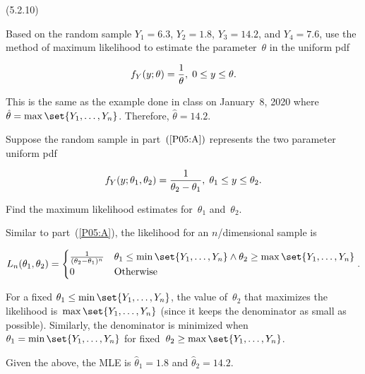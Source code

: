 \begin{problem}
  (\textnormal{5.2.10})
\end{problem}

\begin{subproblem}\label{P05:A}
  Based on the random sample ${Y_1=6.3}$, ${Y_2 = 1.8}$, ${Y_3 = 14.2}$, and ${Y_4 = 7.6}$, use the method of maximum likelihood to estimate the parameter~$\theta$ in the uniform pdf

  \begin{equation}
    f_{Y}(y;\theta) = \frac{1}{\theta}, \hspace{0.1cm} 0 \leq y \leq \theta \text{.}
  \end{equation}
\end{subproblem}

This is the same as the example done in class on January~8, 2020 where ${\hat{\theta} = \max\set{Y_1,\ldots,Y_{n}}}$.  Therefore, $\boxed{{\hat{\theta} = 14.2}}$.

\begin{subproblem}
  Suppose the random sample in part~$(\ref{P05:A})$ represents the two parameter uniform pdf

  \begin{equation}\label{eq:P05:b}
    f_{Y}(y;\theta_1,\theta_2) = \frac{1}{\theta_2 - \theta_1}, \hspace{0.1cm} \theta_{1} \leq y \leq \theta_{2} \text{.}
  \end{equation}

  \noindent
  Find the maximum likelihood estimates for~$\theta_1$ and~$\theta_{2}$.
\end{subproblem}

Similar to part~(\ref{P05:A}), the likelihood for an $n$\-/dimensional sample is

\begin{equation}
  L_{n}(\theta_{1},\theta_{2}) =  \begin{cases}
                                    \frac{1}{(\theta_{2} - \theta_{1})^{n}} & \theta_{1} \leq \min\set{Y_1,\ldots,Y_n} \wedge \theta_2 \geq \max\set{Y_1,\ldots,Y_n} \\
                                    0 & \text{Otherwise}
                                  \end{cases}\text{.}
\end{equation}

\noindent
For a fixed ${\theta_{1} \leq \min\set{Y_{1},\ldots,Y_{n}}}$, the value of~$\theta_{2}$ that maximizes the likelihood is~${\max\set{Y_1,\ldots,Y_n}}$ (since it keeps the denominator as small as possible).  Similarly, the denominator is minimized when ${\theta_{1} = \min\set{Y_{1},\ldots,Y_{n}}}$ for fixed~${\theta_{2} \geq \max\set{Y_{1},\ldots,Y_{n}}}$.

Given the above, the MLE is $\boxed{{\hat{\theta}_{1}=1.8}}$ and $\boxed{{\hat{\theta}_{2} = 14.2}}$.
